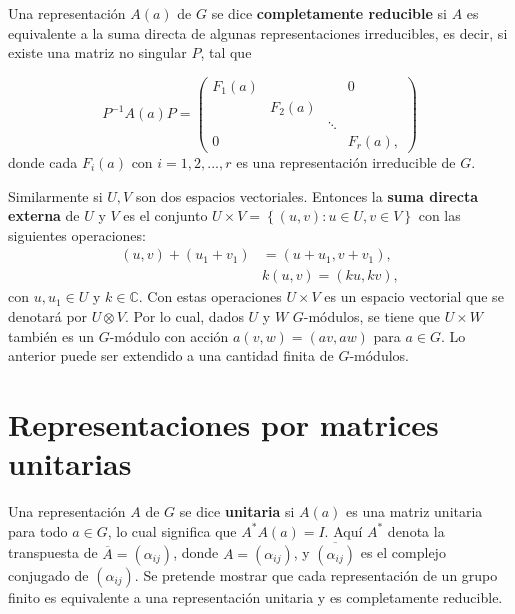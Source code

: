 \documentclass[12pt]{book}
\theoremstyle{definition}
\newcounter{in}
\newcounter{ini}
\begin{document}
Una representación $A\left(a\right)$ de $G$ se dice \textbf{completamente
reducible} si $A$ es equivalente a la suma directa de algunas
representaciones irreducibles, es decir, si existe una matriz no singular
$P$, tal que

\begin{equation*}
 P^{-1}A\left(a\right)P=
 \begin{pmatrix}
   F_{1}(a) & & & 0\\
   & F_{2}(a) & & \\
   & & \ddots & \\
   0 & & & F_{r}(a),
 \end{pmatrix}
\end{equation*}
donde cada $F_{i}\left(a\right)$ con $i=1,2,...,r$ es una
representación irreducible de $G$.

\begin{mdframed}
  Similarmente si $U,V$ son dos espacios vectoriales. Entonces la
  \textbf{suma directa externa} de $U$ y $V$ es el conjunto
  $U \times V = \left \{ (u,v) \colon u \in U, v \in V \right \}$ con
  las siguientes operaciones:
  \begin{equation}
    \label{eq:94}
    \begin{split}
(u,v)+(u_1+v_1) & = (u+u_1,v+v_1), \\
 & k(u,v) = (ku,kv),
\end{split}
  \end{equation}
  con $u, u_1 \in U$ y $k \in \mathbb{C}$. Con estas operaciones
  $U \times V$ es un espacio vectorial que se denotará por
  $U \otimes V$.  Por lo cual, dados $U$ y $W$ $G$-módulos, se tiene
  que $U \times W$ también es un $G$-módulo con acción
  $a(v,w) = (av,aw)$ para $a \in G$. Lo anterior puede ser extendido a
  una cantidad finita de $G$-módulos.
\end{mdframed}
\section{Representaciones por matrices unitarias}
\label{sec:munitarias}

Una representación $A$ de $G$ se dice \textbf{unitaria} si $A\left(a\right)$ es
una matriz unitaria para todo $a \in G$, lo cual significa que
$A^{*}A\left(a\right)=I$. Aquí $A^{*}$ denota la transpuesta de
$\overline{A}=\left(\alpha_{ij}\right)$, donde
$A=\left(\alpha_{ij}\right)$, y $\overline{\left(\alpha_{ij}\right)}$
es el complejo conjugado de $\left(\alpha_{ij}\right)$. Se pretende
mostrar que cada representación de un grupo finito es equivalente a
una representación unitaria y es completamente reducible.
\end{document}
